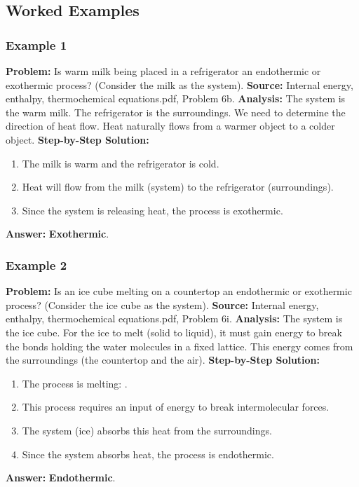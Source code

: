 \documentclass{article}
\begin{document}
\subsection{Worked Examples}
\subsubsection{Example 1}
\textbf{Problem:} Is warm milk being placed in a refrigerator an endothermic or exothermic process? (Consider the milk as the system).
\textbf{Source:} Internal energy, enthalpy, thermochemical equations.pdf, Problem 6b.
\textbf{Analysis:} The system is the warm milk. The refrigerator is the surroundings. We need to determine the direction of heat flow. Heat naturally flows from a warmer object to a colder object.
\textbf{Step-by-Step Solution:}
\begin{enumerate}
    \item The milk is warm and the refrigerator is cold.
    \item Heat will flow from the milk (system) to the refrigerator (surroundings).
    \item Since the system is releasing heat, the process is exothermic.
\end{enumerate}
\textbf{Answer:} \textbf{Exothermic}.

\subsubsection{Example 2}
\textbf{Problem:} Is an ice cube melting on a countertop an endothermic or exothermic process? (Consider the ice cube as the system).
\textbf{Source:} Internal energy, enthalpy, thermochemical equations.pdf, Problem 6i.
\textbf{Analysis:} The system is the ice cube. For the ice to melt (solid to liquid), it must gain energy to break the bonds holding the water molecules in a fixed lattice. This energy comes from the surroundings (the countertop and the air).
\textbf{Step-by-Step Solution:}
\begin{enumerate}
    \item The process is melting: .
    \item This process requires an input of energy to break intermolecular forces.
    \item The system (ice) absorbs this heat from the surroundings.
    \item Since the system absorbs heat, the process is endothermic.
\end{enumerate}
\textbf{Answer:} \textbf{Endothermic}.
\end{document}
